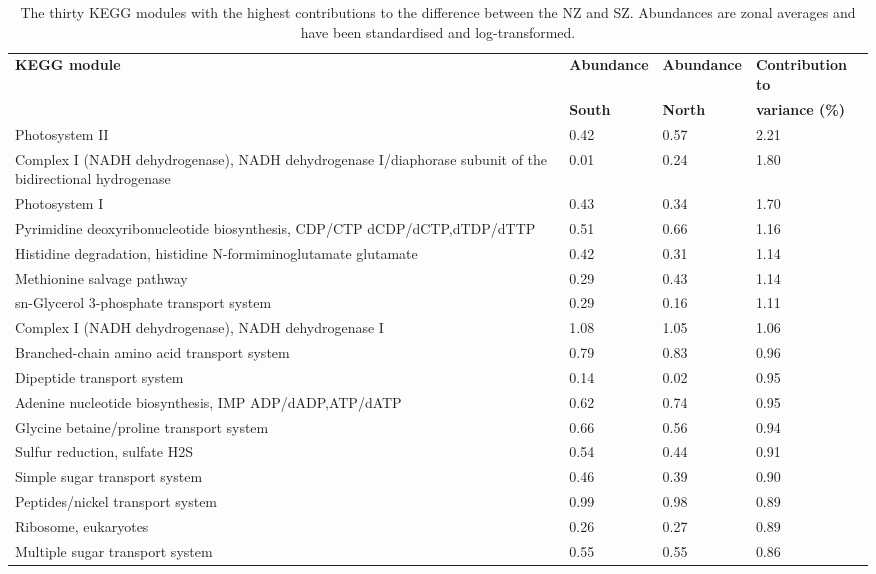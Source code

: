 \begin{sidewaystable}
\sffamily
\begin{center}
\caption[Contributions of KEGG modules to variance between the North and South zones]{\sffamily{}The thirty \ac{KEGG} modules with the highest contributions to the difference between the \ac{NZ} and \ac{SZ}.
Abundances are zonal averages and have been standardised and log-transformed.
}
\label{tab:modulessimper}
\smallskip
\begin{tabularx}{\textwidth}{Xlll}
\toprule
\textbf{\ac{KEGG} module} & \textbf{Abundance} & \textbf{Abundance} & \textbf{Contribution to}\\
& \textbf{South} & \textbf{North} & \textbf{variance (\%)}\\
\midrule
Photosystem II & 0.42 & 0.57 & 2.21\\
Complex I (NADH dehydrogenase), NADH dehydrogenase I/diaphorase subunit of the bidirectional hydrogenase & 0.01 & 0.24 & 1.80\\
Photosystem I & 0.43 & 0.34 & 1.70\\
Pyrimidine deoxyribonucleotide biosynthesis, CDP/CTP \textrightarrow{} dCDP/dCTP,dTDP/dTTP & 0.51 & 0.66 & 1.16\\
Histidine degradation, histidine \textrightarrow{} N-formiminoglutamate \textrightarrow{} glutamate & 0.42 & 0.31 & 1.14\\
Methionine salvage pathway & 0.29 & 0.43 & 1.14\\
sn-Glycerol 3-phosphate transport system & 0.29 & 0.16 & 1.11\\
Complex I (NADH dehydrogenase), NADH dehydrogenase I & 1.08 & 1.05 & 1.06\\
Branched-chain amino acid transport system & 0.79 & 0.83 & 0.96\\
Dipeptide transport system & 0.14 & 0.02 & 0.95\\
Adenine nucleotide biosynthesis, IMP \textrightarrow{} ADP/dADP,ATP/dATP & 0.62 & 0.74 & 0.95\\
Glycine betaine/proline transport system & 0.66 & 0.56 & 0.94\\
Sulfur reduction, sulfate \textrightarrow{} H2S & 0.54 & 0.44 & 0.91\\
Simple sugar transport system & 0.46 & 0.39 & 0.90\\
Peptides/nickel transport system & 0.99 & 0.98 & 0.89\\
Ribosome, eukaryotes & 0.26 & 0.27 & 0.89\\
Multiple sugar transport system & 0.55 & 0.55 & 0.86\\

\end{tabularx}
\end{center}
\end{sidewaystable}

